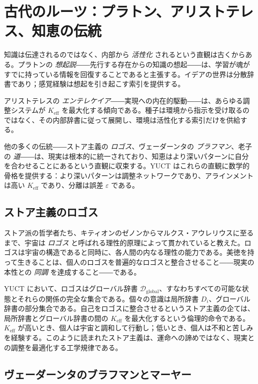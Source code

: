 \documentclass[12pt,a4paper]{article}
\begin{document}
	\section{古代のルーツ：プラトン、アリストテレス、知恵の伝統}
	
	知識は伝達されるのではなく、内部から \emph{活性化} されるという直観は古くからある。プラトンの \emph{想起説}――先行する存在からの知識の想起――は、学習が魂がすでに持っている情報を回復することであると主張する。イデアの世界は分散辞書であり；感覚経験は想起を引き起こす索引を提供する。
	
	アリストテレスの \emph{エンテレケイア}――実現への内在的駆動――は、あらゆる調整システムが \(K_{\mathrm{eff}}\) を最大化する傾向である。種子は環境から指示を受け取るのではなく、その内部辞書に従って展開し、環境は活性化する索引だけを供給する。
	
	他の多くの伝統――ストア主義の \emph{ロゴス}、ヴェーダーンタの \emph{ブラフマン}、老子の \emph{道}――は、現実は根本的に統一されており、知恵はより深いパターンに自分を合わせることにあるという直観に収束する。YUCT はこれらの直観に数学的骨格を提供する：より深いパターンは調整ネットワークであり、アラインメントは高い \(K_{\mathrm{eff}}\) であり、分離は誤差 \(\varepsilon\) である。
	
	\subsection{ストア主義のロゴス}
	
	ストア派の哲学者たち、キティオンのゼノンからマルクス・アウレリウスに至るまで、宇宙は \emph{ロゴス} と呼ばれる理性的原理によって貫かれていると教えた。ロゴスは宇宙の構造であると同時に、各人間の内なる理性の能力である。美徳を持って生きることは、個人のロゴスを普遍的なロゴスと整合させること――現実の本性との \emph{同調} を達成すること――である。
	
	YUCT において、ロゴスはグローバル辞書 \(\mathcal{D}_{\text{global}}\)、すなわちすべての可能な状態とそれらの関係の完全な集合である。個々の意識は局所辞書 \(D_i\)、グローバル辞書の部分集合である。自己をロゴスに整合させるというストア主義の企ては、局所辞書とグローバル辞書の間の \(K_{\mathrm{eff}}\) を最大化するという倫理的命令である。\(K_{\mathrm{eff}}\) が高いとき、個人は宇宙と調和して行動し；低いとき、個人は不和と苦しみを経験する。このように読まれたストア主義は、運命への諦めではなく、現実との調整を最適化する工学規律である。
	
	\subsection{ヴェーダーンタのブラフマンとマーヤー}
	
\end{document}
